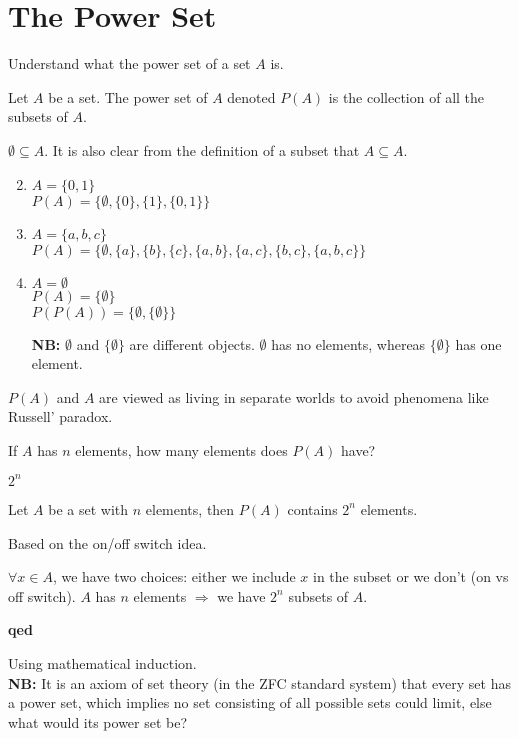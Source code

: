 \documentclass[10pt]{article}
\begin{document}
	\section{The Power Set}
	\begin{description}
		\item[Task:] Understand what the power set of a set $A$ is.
		\item[Definition:] Let $A$ be a set. The power set of $A$ denoted $P(A)$ is the collection of all the subsets of $A$.
		\item[Recall:] $\emptyset \subseteq A$. It is also clear from the definition of a subset that $A \subseteq A$.
		\item[Examples:]
		\begin{enumerate}
			\item[]
			\item $A=\{0, 1\}$ \\
			$P(A) = \{\emptyset, \{0\}, \{1\}, \{0, 1\} \}$
			\item $A=\{a, b, c\}$ \\
			$P(A) = \{\emptyset, \{a\}, \{b\}, \{c\}, \{a, b\}, \{a, c\}, \{b, c\}, \{a, b, c\} \}$
			\item $A = \emptyset$ \\
			$P(A) = \{\emptyset\}$ \\
			$P(P(A)) = \{\emptyset, \{\emptyset\} \}$
			\item [\textbf{NB:}] $\emptyset$ and $\{\emptyset\}$ are different objects. $\emptyset$ has no elements, whereas $\{\emptyset\}$ has one element.
		\end{enumerate}
		\item[Remark:] $P(A)$ and $A$ are viewed as living in separate worlds to avoid phenomena like Russell' paradox.
		\item[Q:] If $A$ has $n$ elements, how many elements does $P(A)$ have?
		\item[A:] $2^n$
		\item[Theorem:] Let $A$ be a set with $n$ elements, then $P(A)$ contains $2^n$ elements.
		\item[Proof:] Based on the on/off switch idea.
		\item $\forall x \in A$, we have two choices: either we include $x$ in the subset or we don't (on vs off switch). $A$ has $n$ elements $\Rightarrow$ we have $2^n$ subsets of $A$.
		\item \textbf{qed}
		\item [Alternate Proof:] Using mathematical induction. \\
		\textbf{NB:} It is an axiom of set theory (in the ZFC standard system) that every set has a power set, which implies no set consisting of all possible sets could limit, else what would its power set be?
	\end{description}
	
\end{document}
